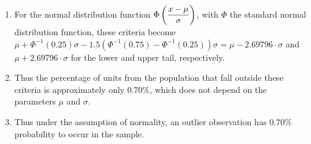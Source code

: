 \begin{enumerate}
    \item For the normal distribution function $\Phi\left(\dfrac{x - \mu}{\sigma}\right)$, with $\Phi$ the standard normal distribution function, these criteria become $\mu + \Phi^{-1}(0.25)\sigma - 1.5(\Phi^{-1}(0.75) - \Phi^{-1}(0.25))\sigma = \mu - 2.69796\cdot\sigma$ and $\mu + 2.69796\cdot\sigma$ for the lower and upper tail, respectively. 
    \hfill \cite{statistics/book/Statistics-for-Data-Scientists/Maurits-Kaptein}

    \item Thus the percentage of units from the population that fall outside these criteria is approximately only $0.70\%$, which does not depend on the parameters $\mu$ and $\sigma$. 
    \hfill \cite{statistics/book/Statistics-for-Data-Scientists/Maurits-Kaptein}
    
    \item Thus under the assumption of normality, an outlier observation has $0.70\%$ probability to occur in the sample.
    \hfill \cite{statistics/book/Statistics-for-Data-Scientists/Maurits-Kaptein}
\end{enumerate}























